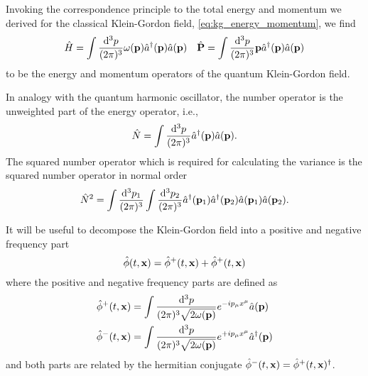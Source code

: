 \begin{lemma}
	Invoking the correspondence principle to the total energy and momentum we derived for the classical Klein-Gordon field, \cref{eq:kg_energy_momentum}, we find
	\begin{align}
		\hat{H}
		=
		\int\frac{\dd[3]{p}}{(2\pi)^3}
		\omega(\vb{p})\hat{a}^\dagger(\vb{p})\hat{a}(\vb{p})
		&&
		\hat{\vb{P}}
		=
		\int\frac{\dd[3]{p}}{(2\pi)^3}
		\vb{p}\hat{a}^\dagger(\vb{p})\hat{a}(\vb{p})
		\label{eq:qkg_energy_momentum}
	\end{align}
	to be the energy and momentum operators of the quantum Klein-Gordon field.
\end{lemma}
\begin{corollary}
	In analogy with the quantum harmonic oscillator, the number operator is the unweighted part of the energy operator, i.e.,
	\begin{equation}
		\hat{N}
		=
		\int\frac{\dd[3]{p}}{(2\pi)^3}
		\hat{a}^\dagger(\vb{p})
		\hat{a}(\vb{p})
		\label{eq:qkg_number}
		.
	\end{equation}
	The squared number operator which is required for calculating the variance is the squared number operator in normal order~\cite{Barnett2002}
	\begin{equation}
		\hat{N}^2
		=
		\int\frac{\dd[3]{p_1}}{(2\pi)^3}
		\int\frac{\dd[3]{p_2}}{(2\pi)^3}
		\hat{a}^\dagger(\vb{p}_1)
		\hat{a}^\dagger(\vb{p}_2)
		\hat{a}(\vb{p}_1)
		\hat{a}(\vb{p}_2)
		.
	\end{equation}
\end{corollary}

\begin{definition}
	It will be useful to decompose the Klein-Gordon field into a positive and negative frequency part
	\begin{equation}
		\hat\phi(t,\vb{x})
		=
		\hat\phi^+(t,\vb{x})
		+
		\hat\phi^+(t,\vb{x})
	\end{equation}
	where the positive and negative frequency parts are defined as~\cite[p.~26]{Peskin1995}
	\begin{equation}
		\begin{split}
			\hat\phi^+(t,\vb{x})
			&=
			\int\frac{\dd[3]{p}}{(2\pi)^3\sqrt{2\omega(\vb{p})}}
			e^{-ip_\mu x^\mu}
			\hat{a}(\vb{p})
			\\
			\hat\phi^-(t,\vb{x})
			&=
			\int\frac{\dd[3]{p}}{(2\pi)^3\sqrt{2\omega(\vb{p})}}
			e^{+ip_\mu x^\mu}
			\hat{a}^\dagger(\vb{p})
		\end{split}
		\label{eq:qkg_positive_negative_frequency}
	\end{equation}
	and both parts are related by the hermitian conjugate $\hat\phi^-(t,\vb{x})=\hat\phi^+(t,\vb{x})^\dagger$.
\end{definition}

